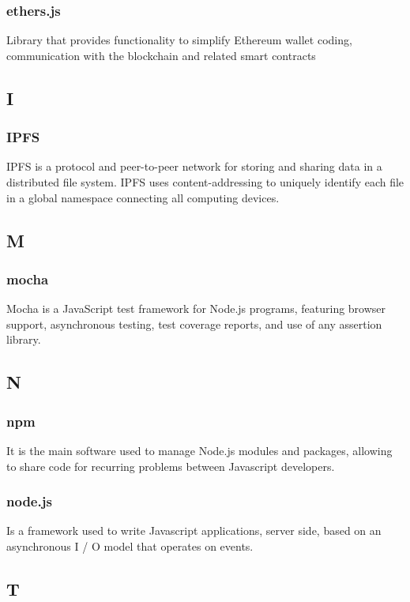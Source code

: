 		\subsubsection*{ethers.js}
			Library that provides functionality to simplify Ethereum wallet coding, communication with the blockchain and related smart contracts
	
	\subsection{I}
		\subsubsection*{IPFS}
			IPFS is a protocol and peer-to-peer network for storing and sharing data in a distributed file system. IPFS uses content-addressing to uniquely identify each file in a global namespace connecting all computing devices. 
		
	\subsection{M}
		\subsubsection*{mocha}
			Mocha is a JavaScript test framework for Node.js programs, featuring browser support, asynchronous testing, test coverage reports, and use of any assertion library.
	
	\subsection{N}
		\subsubsection*{npm}
			It is the main software used to manage Node.js modules and packages, allowing to share code for recurring problems between Javascript developers.
		\subsubsection*{node.js}
			Is a framework used to write Javascript applications, server side, based on an asynchronous I / O model that operates on events.
	
	
	\subsection{T}
